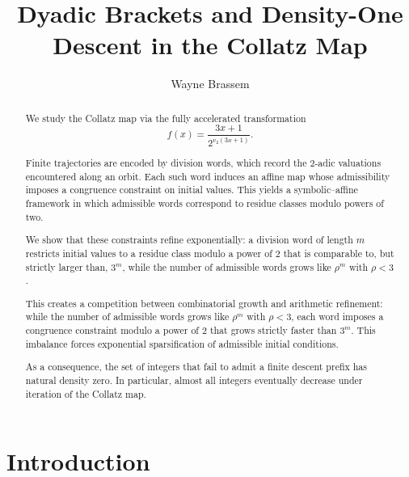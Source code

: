 \documentclass[12pt, oneside]{article}
\title{Dyadic Brackets and Density-One Descent in the Collatz Map}
\author{Wayne Brassem}
\numberwithin{equation}{section}
\theoremstyle{definition}
\theoremstyle{plain}
\theoremstyle{remark}
\begin{document}


\maketitle

\begin{abstract}

We study the Collatz map via the fully accelerated transformation
\[
f(x)=\frac{3x+1}{2^{v_2(3x+1)}}.
\]

Finite trajectories are encoded by division words, which record the
2-adic valuations encountered along an orbit. Each such word induces
an affine map whose admissibility imposes a congruence constraint on
initial values. This yields a symbolic–affine framework in which
admissible words correspond to residue classes modulo powers of two.

We show that these constraints refine exponentially: a division word
of length $m$ restricts initial values to a residue class modulo a
power of $2$ that is comparable to, but strictly larger than, $3^m$,
while the number of admissible words grows like $\rho^m$ with $\rho < 3$.

This creates a competition between combinatorial growth and arithmetic
refinement: while the number of admissible words grows like $\rho^m$
with $\rho < 3$, each word imposes a congruence constraint modulo a
power of $2$ that grows strictly faster than $3^m$. This imbalance
forces exponential sparsification of admissible initial conditions.

As a consequence, the set of integers that fail to admit a finite
descent prefix has natural density zero. In particular, almost all
integers eventually decrease under iteration of the Collatz map.

\end{abstract}

\newpage
\tableofcontents

\newpage
\section{Introduction}
\end{document}
